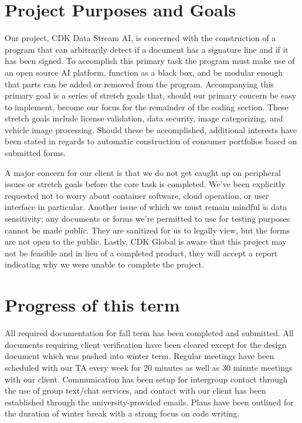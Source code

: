 \documentclass[onecolumn, draftclsnofoot,10pt, compsoc]{IEEEtran}
\begin{document}
\newpage
{}
\tableofcontents
\clearpage

\section{Project Purposes and Goals}
Our project, CDK Data Stream AI, is concerned with the construction of a program that can arbitrarily detect if a document has a signature line and if it has been signed. To accomplish this primary task the program must make use of an open source AI platform, function as a black box, and be modular enough that parts can be added or removed from the program. Accompanying this primary goal is a series of stretch goals that, should our primary concern be easy to implement, become our focus for the remainder of the coding section. These stretch goals include license validation, data security, image categorizing, and vehicle image processing. Should these be accomplished, additional interests have been stated in regards to automatic construction of consumer portfolios based on submitted forms. 

A major concern for our client is that we do not get caught up on peripheral issues or stretch goals before the core task is completed. We’ve been explicitly requested not to worry about container software, cloud operation, or user interface in particular. Another issue of which we must remain mindful is data sensitivity; any documents or forms we’re permitted to use for testing purposes cannot be made public. They are sanitized for us to legally view, but the forms are not open to the public. Lastly, CDK Global is aware that this project may not be feasible and in lieu of a completed product, they will accept a report indicating why we were unable to complete the project. 

\section{Progress of this term}
All required documentation for fall term has been completed and submitted. All documents requiring client verification have been cleared except for the design document which was pushed into winter term. Regular meetings have been scheduled with our TA every week for 20 minutes as well as 30 minute meetings with our client. Communication has been setup for intergroup contact through the use of group text/chat services, and contact with our client has been established through the university-provided emails. Plans have been outlined for the duration of winter break with a strong focus on code writing. 
\end{document}
